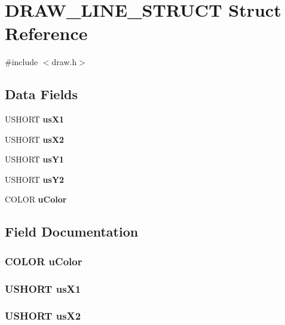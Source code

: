 \section{DRAW\_\-LINE\_\-STRUCT Struct Reference}
\label{struct_d_r_a_w___l_i_n_e___s_t_r_u_c_t}


{\ttfamily \#include $<$draw.h$>$}\subsection*{Data Fields}
\begin{DoxyCompactItemize}
\item 
USHORT {\bf usX1}
\item 
USHORT {\bf usX2}
\item 
USHORT {\bf usY1}
\item 
USHORT {\bf usY2}
\item 
COLOR {\bf uColor}
\end{DoxyCompactItemize}


\subsection{Field Documentation}
\subsubsection[{uColor}]{\setlength{\rightskip}{0pt plus 5cm}COLOR {\bf uColor}}\label{struct_d_r_a_w___l_i_n_e___s_t_r_u_c_t_a2d70c63f42cf74663e6824f90954b7d4}
\subsubsection[{usX1}]{\setlength{\rightskip}{0pt plus 5cm}USHORT {\bf usX1}}\label{struct_d_r_a_w___l_i_n_e___s_t_r_u_c_t_a73c253956dcaeb21151c04c4ac0be1eb}
\subsubsection[{usX2}]{\setlength{\rightskip}{0pt plus 5cm}USHORT {\bf usX2}}\label{struct_d_r_a_w___l_i_n_e___s_t_r_u_c_t_a429b0303c224f6503e0db2da425cb669}
